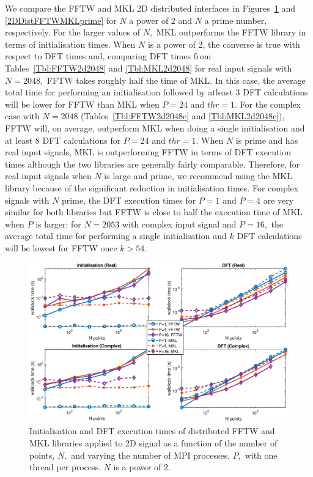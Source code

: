 \documentclass[a4paper]{article}
\begin{document}
We compare the FFTW and MKL 2D distributed interfaces in
Figures~\ref{2DDistFFTWMKL2} and \ref{2DDistFFTWMKLprime} for $N$ a
power of 2 and $N$ a prime number, respectively. For the larger values
of $N,$ MKL outperforms the FFTW library in terms of initialisation
times. When $N$ is a power of 2, the converse is true with respect to
DFT times and, comparing DFT times from Tables~\ref{Tbl:FFTW2d2048}
and \ref{Tbl:MKL2d2048} for real input signals with $N=2048,$ FFTW
takes roughly half the time of MKL. In this case, the average total
time for performing an initialisation followed by atleast 3 DFT
calculations will be lower for FFTW than MKL when $P=24$ and $thr=1.$
For the complex case with $N=2048$ (Tables~\ref{Tbl:FFTW2d2048c} and
\ref{Tbl:MKL2d2048c}), FFTW will, on average, outperform MKL when
doing a single initialisation and at least 8 DFT calculations for
$P=24$ and $thr=1.$ When $N$ is prime and has real input signals, MKL
is outperforming FFTW in terms of DFT execution times although the two
libraries are generally fairly comparable. Therefore, for real input
signals when $N$ is large and prime, we recommend using the MKL
library because of the significant reduction in initialisation
times. For complex signals with $N$ prime, the DFT execution times for
$P=1$ and $P=4$ are very similar for both libraries but FFTW is close
to half the execution time of MKL when $P$ is larger: for $N=2053$
with complex input signal and $P=16,$ the average total time for
performing a single initialisation and $k$ DFT calculations will be
lowest for FFTW once $k>54.$ 


\begin{figure}[htb]
    \centering
    \includegraphics[width=0.9\linewidth]{../results/fftw_mkl_2_2d_mpi.eps}
  \caption{Initialisation and DFT execution times of distributed FFTW and MKL libraries applied to 2D signal as a function of the
    number of points, $N,$ and varying the number of MPI processes, $P,$ with one thread per process. $N$ is a power of 2.}
  \label{2DDistFFTWMKL2}
\end{figure}
\end{document}
